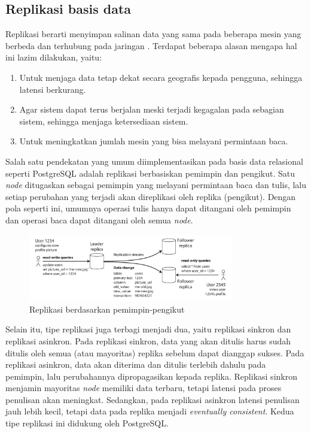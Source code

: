 \subsection{Replikasi basis data}

Replikasi berarti menyimpan salinan data yang sama pada beberapa mesin yang berbeda dan terhubung pada jaringan \parencite{dataIntensiveApplications}. Terdapat beberapa alasan mengapa hal ini lazim dilakukan, yaitu:

\begin{enumerate}
    \item Untuk menjaga data tetap dekat secara geografis kepada pengguna, sehingga latensi berkurang.
    \item Agar sistem dapat terus berjalan meski terjadi kegagalan pada sebagian sistem, sehingga menjaga ketersediaan sistem.
    \item Untuk meningkatkan jumlah mesin yang bisa melayani permintaan baca.
\end{enumerate}

Salah satu pendekatan yang umum diimplementasikan pada basis data relasional seperti PostgreSQL adalah replikasi berbasiskan pemimpin dan pengikut. Satu \textit{node} ditugaskan sebagai pemimpin yang melayani permintaan baca dan tulis, lalu setiap perubahan yang terjadi akan direplikasi oleh replika (pengikut). Dengan pola seperti ini, umumnya operasi tulis hanya dapat ditangani oleh pemimpin dan operasi baca dapat ditangani oleh semua \textit{node}.

\begin{figure}[htbp]
    \centering
    \includegraphics[width=0.8\textwidth]{resources/chapter-2/leader-based-replication.png}
    \caption{Replikasi berdasarkan pemimpin-pengikut \parencite{dataIntensiveApplications}}
    \label{fig:leader-based-replication}
\end{figure}

Selain itu, tipe replikasi juga terbagi menjadi dua, yaitu replikasi sinkron dan replikasi asinkron. Pada replikasi sinkron, data yang akan ditulis harus sudah ditulis oleh semua (atau mayoritas) replika sebelum dapat dianggap sukses. Pada replikasi asinkron, data akan diterima dan ditulis terlebih dahulu pada pemimpin, lalu perubahannya dipropagasikan kepada replika. Replikasi sinkron menjamin mayoritas \textit{node} memiliki data terbaru, tetapi latensi pada proses penulisan akan meningkat. Sedangkan, pada replikasi asinkron latensi penulisan jauh lebih kecil, tetapi data pada replika menjadi \textit{eventually consistent}. Kedua tipe replikasi ini didukung oleh PostgreSQL.
